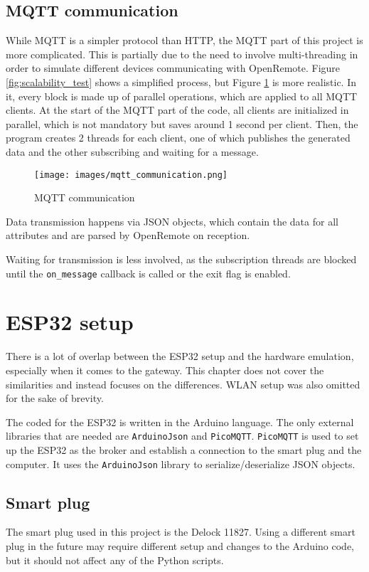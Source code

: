 \subsection{MQTT communication}
While MQTT is a simpler protocol than HTTP, the MQTT part of this project is more complicated. This is partially due to the need to involve multi-threading in order to simulate different devices communicating with OpenRemote. Figure \ref{fig:scalability_test} shows a simplified process, but Figure \ref{fig:mqtt_communication} is more realistic. In it, every block is made up of parallel operations, which are applied to all MQTT clients. At the start of the MQTT part of the code, all clients are initialized in parallel, which is not mandatory but saves around 1 second per client. Then, the program creates 2 threads for each client, one of which publishes the generated data and the other subscribing and waiting for a message.  

\begin{figure}[ht]
    \centering
    \texttt{[image: images/mqtt\_communication.png]}
    \caption{MQTT communication}
    \label{fig:mqtt_communication}
\end{figure}

Data transmission happens via JSON objects, which contain the data for all attributes and are parsed by OpenRemote on reception.

Waiting for transmission is less involved, as the subscription threads are blocked until the \lstinline|on_message| callback is called or the exit flag is enabled. 

\section{ESP32 setup}
There is a lot of overlap between the ESP32 setup and the hardware emulation, especially when it comes to the gateway. This chapter does not cover the similarities and instead focuses on the differences. WLAN setup was also omitted for the sake of brevity.

The coded for the ESP32 is written in the Arduino language. The only external libraries that are needed are \lstinline|ArduinoJson| \cite{arduino_json} and \lstinline|PicoMQTT|\cite{pico_mqtt}. \lstinline|PicoMQTT| is used to set up the ESP32 as the broker and establish a connection to the smart plug and the computer. It uses the \lstinline|ArduinoJson| library to serialize/deserialize JSON objects. 

\subsection{Smart plug}
The smart plug used in this project is the Delock 11827. Using a different smart plug in the future may require different setup and changes to the Arduino code, but it should not affect any of the Python scripts. 

